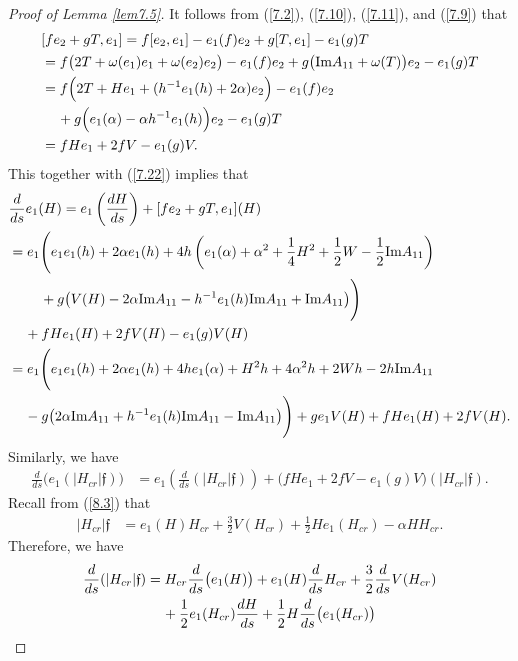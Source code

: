 \documentclass{amsart}
\theoremstyle{Corollary}
\numberwithin{equation}{section}
\begin{document}
\begin{proof}[Proof of Lemma \ref{lem7.5}]
It follows from (\ref{7.2}), (\ref{7.10}), (\ref{7.11}), and 
(\ref{7.9}) 
that 
\begin{align*}
&[fe_2+gT,e_1]
=f[e_2,e_1]-e_1(f) e_2+g[T,e_1]-e_1(g)T\\
&=f\big(2T+\omega(e_1)e_1+\omega(e_2)e_2\big)-e_1(f) e_2
+g\big(\mbox{Im}A_{11}+\omega(T)\big)e_2-e_1(g)T\\
&=f\Big(2T+He_1+(h^{-1}e_1(h)+2\alpha)e_2\Big)-e_1(f) e_2\\
&\hspace{4mm}+g\Big(e_1(\alpha)-\alpha h^{-1}e_1(h)\Big)e_2-e_1(g)T\\
&=fHe_1 +2fV-e_1(g)V.
\end{align*}
This together with (\ref{7.22}) implies that 
\begin{align*}
&\frac{d}{ds}e_1(H)
=e_1\left(\frac{dH}{ds}\right)+[fe_2+gT,e_1](H)\\
&=e_1\Bigg(e_1e_1(h)+2\alpha e_1(h)+4h\left(e_1(\alpha)+\alpha^2+\frac{1}{4}H^2+\frac{1}{2}W-\frac{1}{2}\mbox{Im}A_{11}\right)\\
&\hspace{8mm}
+g\big(V(H)-2\alpha\mbox{Im}A_{11}-h^{-1}e_1(h)\mbox{Im}A_{11}+\mbox{Im}A_{11}\big)\Bigg)\\
&\hspace{4mm}+fHe_1(H) +2fV(H)-e_1(g)V(H)\\
&=e_1\Bigg(e_1e_1(h)+2\alpha e_1(h)+4he_1(\alpha)+H^2h+4\alpha^2h+2Wh-2h\mbox{Im}A_{11}\\
&\hspace{4mm}
-g\big(
2\alpha\mbox{Im}A_{11}+h^{-1}e_1(h)\mbox{Im}A_{11}-\mbox{Im}A_{11}\big)\Bigg)
+ge_1V(H)+fHe_1(H) +2fV(H).
\end{align*}
Similarly, we have 
\begin{align*}
\frac{d}{ds}\big(e_1(|H_{cr}|\mathfrak{f})\big)
&=e_1\left(\frac{d}{ds}(|H_{cr}|\mathfrak{f})\right)+
\big(fHe_1 +2fV-e_1(g)V\big)(|H_{cr}|\mathfrak{f}).
\end{align*}
Recall from (\ref{8.3})
that 
\begin{align*}
|H_{cr}|\mathfrak{f}
&=e_1(H) H_{cr}+\frac{3}{2}V(H_{cr})+\frac{1}{2}H e_1(H_{cr})
-\alpha H H_{cr}. 
\end{align*}
Therefore, we have 
\begin{align*}
\frac{d}{ds}(|H_{cr}|\mathfrak{f})
&= H_{cr}\frac{d}{ds}\big(e_1(H)\big)
+e_1(H)\frac{d}{ds}H_{cr}+\frac{3}{2}\frac{d}{ds}V(H_{cr})\\
&\hspace{4mm}+\frac{1}{2}e_1(H_{cr})\frac{dH}{ds}+\frac{1}{2}H\frac{d}{ds}\big(e_1(H_{cr})\big)\\

\end{align*}
\end{proof}
\end{document}
